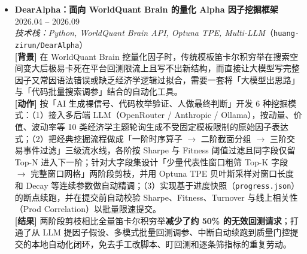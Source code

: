 \documentclass[10pt,letterpaper]{article}
\begin{document}
\begin{itemize}[leftmargin=10pt]
  \item \textbf{DearAlpha：面向 WorldQuant Brain 的量化 Alpha 因子挖掘框架} \hfill 2026.04 -- 2026.09 \\
  \emph{技术栈：Python, WorldQuant Brain API, Optuna TPE, Multi-LLM}（\texttt{huang-zirun/DearAlpha}） \\
  \textbf{[背景]} 在 WorldQuant Brain 挖量化因子时，传统模板笛卡尔积穷举在搜索空间变大后极易卡死在平台回测限流上且写不出新结构，而直接让大模型写完整因子又常因语法错误或缺乏经济学逻辑过拟合，需要一套将「大模型出思路」与「代码批量搜索调参」结合的自动化工具。 \\
  \textbf{[动作]} 按「AI 生成裸信号、代码枚举验证、人做最终判断」开发 6 种挖掘模式：（1）接入多后端 LLM（OpenRouter / Anthropic / Ollama），按动量、价值、波动率等 10 类经济学主题轮询生成不受固定模板限制的原始因子表达式；（2）把经典挖掘流程做成「一阶时序算子 $\rightarrow$ 二阶截面分组 $\rightarrow$ 三阶交易事件过滤」三级流水线，各阶按 Sharpe 与 Fitness 阈值过滤且同字段仅留 Top-N 进入下一阶；针对大字段集设计「少量代表性窗口粗筛 Top-K 字段 $\rightarrow$ 完整窗口网格」两阶段剪枝，并用 Optuna TPE 贝叶斯采样对窗口长度和 Decay 等连续参数做自动精调；（3）实现基于进度快照（\texttt{progress.json}）的断点续跑，并在提交前自动校验 Sharpe、Fitness、Turnover 与线上相关性（Prod Correlation）以批量限速提交。 \\
  \textbf{[结果]} 两阶段剪枝相比全量笛卡尔积穷举\textbf{减少了约 50\% 的无效回测请求}；打通了从 LLM 提因子假设、多模式批量回测调参、中断自动续跑到质量门控提交的本地自动化闭环，免去手工改脚本、盯回测和逐条筛指标的重复劳动。


\end{itemize}
\end{document}
